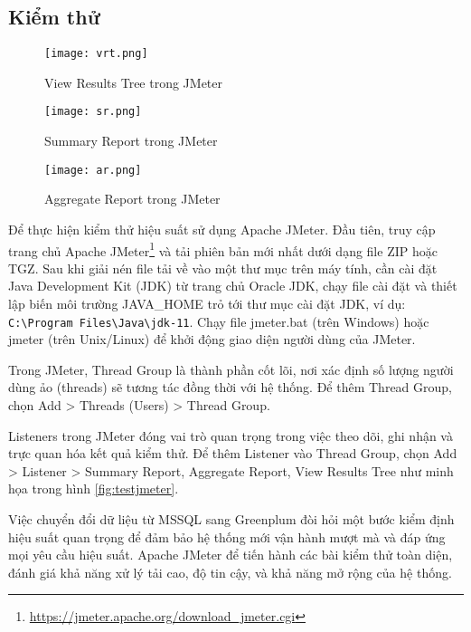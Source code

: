 \subsection{Kiểm thử}


\begin{figure}
    \centering
    \texttt{[image: vrt.png]}
    \caption{View Results Tree trong JMeter}
    \label{fig:vrt}
\end{figure}

\begin{figure}
    \centering
    \texttt{[image: sr.png]}
     \caption{Summary Report trong JMeter}
    \label{fig:sr}
\end{figure}

\begin{figure}
    \centering
    \texttt{[image: ar.png]}
    \caption{Aggregate Report trong JMeter}
    \label{fig:ar}
\end{figure}




Để thực hiện kiểm thử hiệu suất sử dụng Apache JMeter. Đầu tiên, truy cập trang chủ Apache JMeter\footnote{\url{https://jmeter.apache.org/download_jmeter.cgi}} và tải phiên bản mới nhất dưới dạng file ZIP hoặc TGZ. Sau khi giải nén file tải về vào một thư mục trên máy tính, cần cài đặt Java Development Kit (JDK) từ trang chủ Oracle JDK, chạy file cài đặt và thiết lập biến môi trường JAVA\_HOME trỏ tới thư mục cài đặt JDK, ví dụ: \verb|C:\Program Files\Java\jdk-11|. Chạy file jmeter.bat (trên Windows) hoặc jmeter (trên Unix/Linux) để khởi động giao diện người dùng của JMeter.


Trong JMeter, Thread Group là thành phần cốt lõi, nơi xác định số lượng người dùng ảo (threads) sẽ tương tác đồng thời với hệ thống. Để thêm Thread Group, chọn Add > Threads (Users) > Thread Group.

Listeners trong JMeter đóng vai trò quan trọng trong việc theo dõi, ghi nhận và trực quan hóa kết quả kiểm thử. Để thêm Listener vào Thread Group, chọn Add > Listener > Summary Report, Aggregate Report, View Results Tree như minh họa trong hình \ref{fig:testjmeter}.

Việc chuyển đổi dữ liệu từ MSSQL sang Greenplum đòi hỏi một bước kiểm định hiệu suất quan trọng để đảm bảo hệ thống mới vận hành mượt mà và đáp ứng mọi yêu cầu hiệu suất. Apache JMeter để tiến hành các bài kiểm thử toàn diện, đánh giá khả năng xử lý tải cao, độ tin cậy, và khả năng mở rộng của hệ thống.

